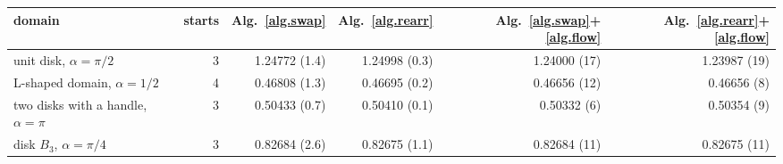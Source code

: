 \begin{tabular}{lrrrrr}
\hline
domain & starts & Alg.~\ref{alg.swap} & Alg.~\ref{alg.rearr} & Alg.~\ref{alg.swap}+\ref{alg.flow} & Alg.~\ref{alg.rearr}+\ref{alg.flow}\\
\hline
unit disk, $\alpha=\pi/2$ & 3 & 1.24772 (1.4) & 1.24998 (0.3) & 1.24000 (17) & 1.23987 (19) \\
L-shaped domain, $\alpha=1/2$ & 4 & 0.46808 (1.3) & 0.46695 (0.2) & 0.46656 (12) & 0.46656 (8) \\
two disks with a handle, $\alpha=\pi$ & 3 & 0.50433 (0.7) & 0.50410 (0.1) & 0.50332 (6) & 0.50354 (9) \\
disk $B_3$, $\alpha=\pi/4$ & 3 & 0.82684 (2.6) & 0.82675 (1.1) & 0.82684 (11) & 0.82675 (11) \\
\hline
\end{tabular}
